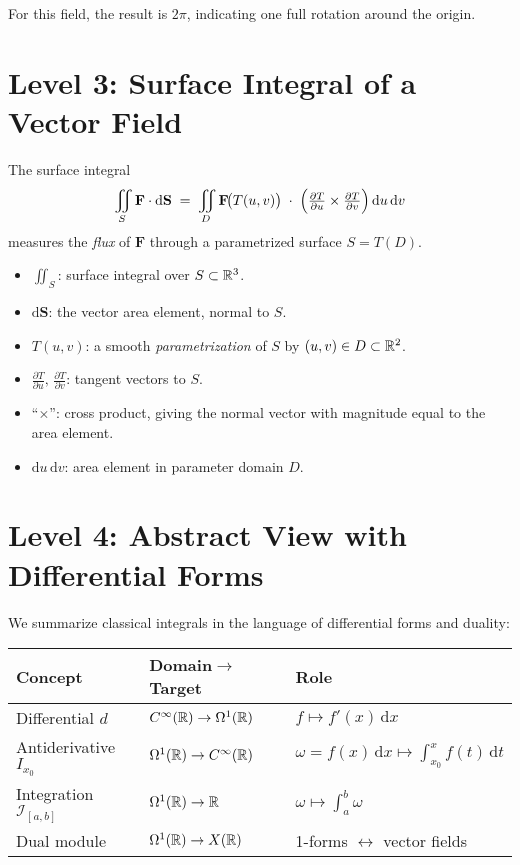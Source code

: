 \documentclass[11pt,openany]{article}
\begin{document}
For this field, the result is
\(\displaystyle 2\pi\), 
indicating one full rotation around the origin.

\medskip

\section*{Level 3: Surface Integral of a Vector Field}

The surface integral
\[
\iint_{S}\mathbf F\cdot \mathrm{d}\mathbf S
\;=\;
\iint_{D}
\mathbf F\!\bigl(T(u,v)\bigr)
\;\cdot\;
\Bigl(\tfrac{\partial T}{\partial u}\times\tfrac{\partial T}{\partial v}\Bigr)
\,\mathrm{d}u\,\mathrm{d}v
\]
measures the \emph{flux} of \(\mathbf F\) through a parametrized surface \(S=T(D)\).

\begin{itemize}
	\item \(\displaystyle \iint_S\): surface integral over \(S\subset\mathbb{R}^3\).
	\item \(\mathrm{d}\mathbf S\): the vector area element, normal to \(S\).
	\item \(T(u,v)\): a smooth \emph{parametrization} of \(S\) by \((u,v)\in D\subset\mathbb{R}^2\).
	\item \(\tfrac{\partial T}{\partial u},\,\tfrac{\partial T}{\partial v}\): tangent vectors to \(S\).
	\item “\(\times\)”: cross product, giving the normal vector with magnitude equal to the area element.
	\item \(\mathrm{d}u\,\mathrm{d}v\): area element in parameter domain \(D\).
\end{itemize}

\medskip

\section*{Level 4: Abstract View with Differential Forms}

We summarize classical integrals in the language of differential forms and duality:

\medskip

\begin{tabular}{lll}
	\hline
	\textbf{Concept} & \textbf{Domain\(\to\)Target} & \textbf{Role} \\
	\hline
	Differential \(d\) & \(C^\infty(\mathbb{R})\to\Omega^1(\mathbb{R})\) 
	& \(f\mapsto f'(x)\,\mathrm{d}x\) \\
	Antiderivative \(I_{x_0}\) 
	& \(\Omega^1(\mathbb{R})\to C^\infty(\mathbb{R})\) 
	& \(\omega=f(x)\,\mathrm{d}x\mapsto\int_{x_0}^x f(t)\,\mathrm{d}t\) \\
	Integration \(\mathcal I_{[a,b]}\) 
	& \(\Omega^1(\mathbb{R})\to\mathbb{R}\) 
	& \(\omega\mapsto\int_a^b\omega\) \\
	Dual module 
	& \(\Omega^1(\mathbb{R})\to X(\mathbb{R})\) 
	& 1-forms \(\leftrightarrow\) vector fields \\
	\hline
\end{tabular}
\end{document}
